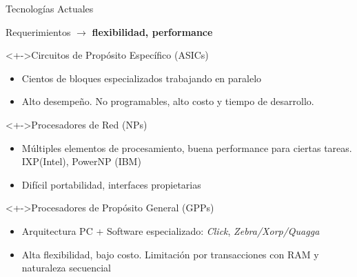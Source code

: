 \documentclass[xcolor=dvipsnames]{beamer}
\begin{document}
\begin {frame}{Tecnologías Actuales}   
  
  Requerimientos $\rightarrow$ {\bf flexibilidad, performance} 
  
  \begin{block}<+->{Circuitos de Propósito Específico (ASICs)} 
    \begin{itemize}
      \scriptsize
      \item Cientos de bloques especializados trabajando en paralelo
      \item Alto desempeño. No programables, alto costo y tiempo de desarrollo.
    \end{itemize}
  \end{block}

  \begin{block}<+->{Procesadores de Red (NPs)}   
    \begin{itemize}
      \scriptsize
      \item Múltiples elementos de procesamiento, buena performance para ciertas tareas. IXP(Intel), PowerNP (IBM)
      \item Difícil portabilidad, interfaces propietarias
    \end{itemize}
  \end{block}

  \begin{block}<+->{Procesadores de Propósito General (GPPs)} 
    \begin{itemize}
      \scriptsize
      \item Arquitectura PC + Software especializado: \emph{Click}, \emph{Zebra/Xorp/Quagga}
      \item Alta flexibilidad, bajo costo. Limitación por transacciones con RAM y naturaleza secuencial
    \end{itemize}
  \end{block}
  
\end{frame}
\end{document}
